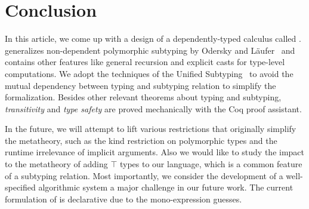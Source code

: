 \section{Conclusion}

In this article, we come up with a design of a dependently-typed calculus called \name.
\name generalizes non-dependent polymorphic subtyping by Odersky and
L\"aufer~\cite{odersky1996putting} and contains other features like general
recursion and explicit casts for type-level computations.
We adopt the techniques of the Unified Subtyping~\cite{full} to
avoid the mutual dependency between typing and subtyping relation to simplify
the formalization. Besides other relevant theorems about typing and subtyping,
\emph{transitivity} and \emph{type safety} are proved mechanically with the Coq
proof assistant.

In the future, we will attempt to lift various restrictions that originally simplify
the metatheory, such as the kind restriction on polymorphic
types and the runtime irrelevance of implicit arguments. Also we would like to
study the impact to the metatheory of adding $\top$ types to our language,
which is a common feature of a subtyping relation.
Most importantly, we consider the development
of a well-specified algorithmic system a major challenge in our future
work. The current formulation of \name is declarative due to the mono-expression guesses.
